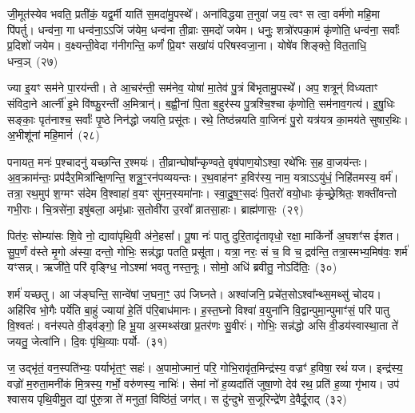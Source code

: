 {\anuvakamend[{अ॒गा॒ꣳ स॒ह॒स्रा॒क्ष॒ दे॒वाः॒ स॒हस्र॑धारा॒मत्यꣳ॑हा॒ अनु॑वर्त्मानः॒ षोड॑श च}]}

जी॒मूत॑स्येव भवति॒ प्रती॑कं॒ यद्व॒र्मी याति॑ स॒मदा॑मु॒पस्थे᳚। अना॑विद्धया त॒नुवा॑ जय॒ त्वꣳ स त्वा॒ वर्म॑णो महि॒मा पि॑पर्तु। धन्व॑ना॒ गा धन्व॑ना॒\-ऽऽ\-जिं ज॑येम॒ धन्व॑ना ती॒व्राः स॒मदो॑ जयेम। धनुः॒ शत्रो॑रपका॒मं कृ॑णोति॒ धन्व॑ना॒ सर्वाः᳚ प्र॒दिशो॑ जयेम। व॒क्ष्यन्ती॒वेदा ग॑नीगन्ति॒ कर्णं॑ प्रि॒यꣳ सखा॑यं परिषस्वजा॒ना। योषे॑व शिङ्क्ते॒ वित॒ताधि॒ धन्व॒ञ्~(२७)\ip

ज्या इ॒यꣳ सम॑ने पा॒रय॑न्ती। ते आ॒चर॑न्ती॒ सम॑नेव॒ योषा॑ मा॒तेव॑ पु॒त्रं बि॑भृतामु॒पस्थे᳚। अप॒ शत्रून्॑ विध्यताꣳ संविदा॒ने आर्त्नी॑ इ॒मे वि॑ष्फु॒रन्ती॑ अ॒मित्रान्॑। ब॒ह्वी॒नां पि॒ता ब॒हुर॑स्य पु॒त्रश्चि॒श्चा कृ॑णोति॒ सम॑नाव॒गत्य॑। इ॒षु॒धिः सङ्काः॒ पृत॑नाश्च॒ सर्वाः᳚ पृ॒ष्ठे निन॑द्धो जयति॒ प्रसू॑तः। रथे॒ तिष्ठ॑न्नयति वा॒जिनः॑ पु॒रो यत्र॑यत्र का॒मय॑ते सुषार॒थिः। अ॒भीशू॑नां महि॒मानं॑~(२८)\ip

पनायत॒ मनः॑ प॒श्चादनु॑ यच्छन्ति र॒श्मयः॑। ती॒व्रान्घोषा᳚न्कृण्वते॒ वृष॑पाण॒यो\-ऽश्वा॒ रथे॑भिः स॒ह वा॒जय॑न्तः। अ॒व॒क्राम॑न्तः॒ प्रप॑दैर॒मित्रा᳚न्क्षि॒णन्ति॒ शत्रू॒ꣳ॒रन॑पव्ययन्तः। र॒थ॒वाह॑नꣳ ह॒विर॑स्य॒ नाम॒ यत्रा\-ऽऽ\-यु॑धं॒ निहि॑तमस्य॒ वर्म॑। तत्रा॒ रथ॒मुप॑ श॒ग्मꣳ स॑देम वि॒श्वाहा॑ व॒यꣳ सु॑मन॒स्यमा॑नाः। स्वा॒दु॒ष॒ꣳ॒सदः॑ पि॒तरो॑ वयो॒धाः कृ॑च्छ्रे॒श्रितः॒ शक्ती॑वन्तो गभी॒राः। चि॒त्रसे॑ना॒ इषु॑बला॒ अमृ॑ध्राः स॒तोवी॑रा उ॒रवो᳚ व्रातसा॒हाः। ब्राह्म॑णासः॒~(२९)\ip

पित॑रः॒ सोम्या॑सः शि॒वे नो॒ द्यावा॑\-पृथि॒वी अ॑ने॒हसा᳚। पू॒षा नः॑ पातु दुरि॒तादृ॑तावृधो॒ रक्षा॒ माकि॑र्नो अ॒घशꣳ॑स ईशत। सु॒प॒र्णं व॑स्ते मृ॒गो अ॑स्या॒ दन्तो॒ गोभिः॒ सन्न॑द्धा पतति॒ प्रसू॑ता। यत्रा॒ नरः॒ सं च॒ वि च॒ द्रव॑न्ति॒ तत्रा॒स्मभ्य॒मिष॑वः॒ शर्म॑ यꣳसन्न्। ऋजी॑ते॒ परि॑ वृङ्ग्धि॒ नो\-ऽश्मा॑ भवतु नस्त॒नूः। सोमो॒ अधि॑ ब्रवीतु॒ नो\-ऽदि॑तिः॒~(३०)\ip

शर्म॑ यच्छतु। आ ज॑ङ्घन्ति॒ सान्वे॑षां ज॒घना॒ꣳ॒ उप॑ जिघ्नते। अश्वा॑जनि॒ प्रचे॑त॒सो\-ऽश्वा᳚न्थ्स॒मथ्सु॑ चोदय। अहि॑रिव भो॒गैः पर्ये॑ति बा॒हुं ज्याया॑ हे॒तिं प॑रि॒बाध॑मानः। ह॒स्त॒घ्नो विश्वा॑ व॒युना॑नि वि॒द्वान्पुमा॒न्पुमाꣳ॑सं॒ परि॑ पातु वि॒श्वतः॑। वन॑स्पते वी॒ड्व॑ङ्गो॒ हि भू॒या अ॒स्मथ्स॑खा प्र॒तर॑णः सु॒वीरः॑। गोभिः॒ सन्न॑द्धो असि वी॒डय॑स्वास्था॒ता ते॑ जयतु॒ जेत्वा॑नि। दि॒वः पृ॑थि॒व्याः पर्यो-~(३१)\ip

ज॒ उद्भृ॑तं॒ वन॒स्पति॑भ्यः॒ पर्याभृ॑त॒ꣳ॒ सहः॑। अ॒पामो॒ज्मानं॒ परि॒ गोभि॒रावृ॑त॒मिन्द्र॑स्य॒ वज्रꣳ॑ ह॒विषा॒ रथं॑ यज। इन्द्र॑स्य॒ वज्रो॑ म॒रुता॒मनी॑कं मि॒त्रस्य॒ गर्भो॒ वरु॑णस्य॒ नाभिः॑। सेमां नो॑ ह॒व्यदा॑तिं जुषा॒णो देव॑ रथ॒ प्रति॑ ह॒व्या गृ॑भाय। उप॑ श्वासय पृथि॒वीमु॒त द्यां पु॑रु॒त्रा ते॑ मनुतां॒ विष्ठि॑तं॒ जग॑त्। स दु॑न्दुभे स॒जूरिन्द्रे॑ण दे॒वैर्दू॒राद्~(३२)\ip

